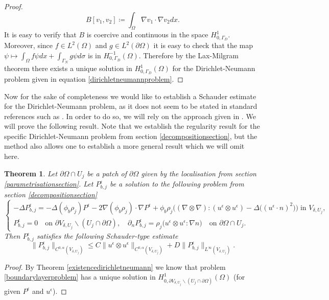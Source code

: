 \documentclass[12pt,a4paper]{article}
\newtheorem{theorem}{Theorem}[section]
\theoremstyle{definition}
\theoremstyle{remark}
\numberwithin{equation}{section}
\begin{document}
\begin{appendices}
\begin{proof}
\begin{equation*}
B[v_1, v_2] \coloneqq \int_{\Omega} \nabla v_1 \cdot \nabla v_2 dx. 
\end{equation*}
It is easy to verify that $B$ is coercive and continuous in the space $H^1_{0,\Gamma_D}$. Moreover, since $f \in L^2 (\Omega)$ and $g \in L^2 (\partial \Omega)$ it is easy to check that the map $\psi \mapsto \int_\Omega f \psi dx + \int_{\Gamma_N} g \psi d \sigma$ is in $H^{-1}_{0,\Gamma_D} (\Omega)$. Therefore by the Lax-Milgram theorem there exists a unique solution in $H^1_{0,\Gamma_D} (\Omega)$ for the Dirichlet-Neumann problem given in equation \eqref{dirichletneumannproblem}.
\end{proof}
Now for the sake of completeness we would like to establish a Schauder estimate for the Dirichlet-Neumann problem, as it does not seem to be stated in standard references such as \cite{gilbarg,giaquinta,krylov}. In order to do so, we will rely on the approach given in \cite{lieberman}. We will prove the following result. Note that we establish the regularity result for the specific Dirichlet-Neumann problem from section \ref{decompositionsection}, but the method also allows one to establish a more general result which we will omit here. 
\begin{theorem} \label{schauderdirichletneumann}
Let $\partial \Omega \cap U_j$ be a patch of $\partial \Omega$ given by the localisation from section \ref{parametrisationsection}. Let $P^\epsilon_{b,j}$ be a solution to the following problem from section \ref{decompositionsection}
\begingroup
\allowdisplaybreaks
\begin{equation} \label{boundarylayerproblem}
\begin{cases}
- \Delta P^\epsilon_{b,j} = - \Delta (\phi_b \rho_j) P^\epsilon - 2  \nabla (\phi_b \rho_j) \cdot \nabla P^\epsilon + \phi_b \rho_j \bigg((\nabla \otimes \nabla) : (u^\epsilon \otimes u^\epsilon) - \Delta \big( (u^\epsilon \cdot n)^2 \big)  \bigg) \; \text{in } V_{\delta,U_j}, \\
P^\epsilon_{b,j} = 0 \quad \text{on } \partial V_{\delta,U_j} \backslash (U_j \cap \partial \Omega) , \quad \partial_n P^\epsilon_{b,j} = \rho_j \big( u^\epsilon \otimes u^\epsilon : \nabla n \big) \quad \text{on } \partial \Omega \cap U_j.
\end{cases}
\end{equation}
\endgroup
Then $P^\epsilon_{b,j}$ satisfies the following Schauder-type estimate
\begin{equation} \label{schauderestimate}
\lVert P^\epsilon_{b,j} \rVert_{C^{0,\alpha} (V_{\delta,U_j})} \leq C \lVert u^\epsilon \otimes u^\epsilon \rVert_{C^{0,\alpha} (V_{\delta,U_j})} + D \lVert P^\epsilon_{b,j} \rVert_{L^\infty (V_{\delta,U_j})}.
\end{equation}
\end{theorem}
\begin{proof}
By Theorem \ref{existencedirichletneumann} we know that problem \eqref{boundarylayerproblem} has a unique solution in $H^1_{0,\partial V_{\delta, U_j} \backslash (U_j \cap \partial \Omega)} (\Omega)$ (for given $P^\epsilon$ and $u^\epsilon$). 


\end{proof}
\end{appendices}
\end{document}
